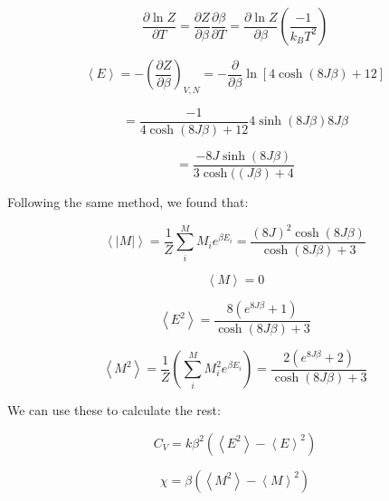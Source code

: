 \[
\frac{\partial \ln Z}{\partial T} = \frac{\partial Z}{\partial \beta}\frac{\partial \beta}{\partial T} = \frac{\partial \ln Z}{\partial \beta}\left(\frac{-1}{k_B T^2}\right)
\]

\[
\left< E\right> = -\left(\frac{\partial Z}{\partial \beta} \right)_{V,N} = - \frac{\partial}{\partial \beta} \ln \left[ 4 \cosh \left( 8J\beta\right)+12\right]
\]

\[
= \frac{-1}{4\cosh (8J\beta) + 12}4 \sinh(8J\beta)8J\beta
\]

\[
= \frac{-8J \sinh(8J\beta)}{3\cosh((J\beta)+ 4}
\]

Following the same method, we found that:

\[
\left< |M| \right> = \frac{1}{Z} \sum_i^M M_i e^{\beta E_i}  = \frac{(8J)^2 \cosh(8J\beta )}{\cosh (8J\beta ) + 3}
\]

\[
\left< M \right> = 0
\]

\[
\left< E^2 \right> = \frac{8 \left( e^{8J\beta } + 1\right) }{\cosh (8J\beta ) + 3}
\]


\[
\left< M^2 \right> = \frac{1}{Z} \left( \sum_i^M M_i^2 e^{\beta E_i}\right) = \frac{2 \left( e^{8J\beta } + 2\right) }{\cosh (8J\beta ) + 3}
\]

We can use these to calculate the rest:

\[
C_V = k \beta^2\left( \left< E^2\right> - \left< E\right>^2 \right)
\]

\[
\chi = \beta \left( \left< M^2\right> - \left< M\right>^2\right)
\]